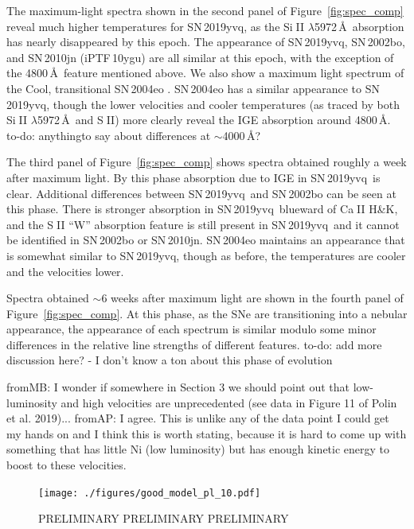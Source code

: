 \documentclass[twocolumn]{aastex63}
\def\ion#1#2{#1$\;${\footnotesize\rm{#2}}\relax}
\newcommand{\frommb}[1]{{\color{purple} fromMB: {#1}}}
\newcommand{\fromabi}[1]{{\color{teal} fromAP: {#1}}}
\newcommand{\todo}[1]{{\color{magenta} to-do: {#1}}}
\newcommand{\sn}{SN\,2019yvq}
\begin{document}
The maximum-light spectra shown in the second panel of
Figure~\ref{fig:spec_comp} reveal much higher temperatures for \sn, as the
\ion{Si}{II} $\lambda$5972\,\AA\ absorption has nearly disappeared by this
epoch. The appearance of \sn, SN\,2002bo, and SN\,2010jn (iPTF\,10ygu) are all
similar at this epoch, with the exception of the 4800\,\AA\ feature mentioned
above. We also show a maximum light spectrum of the \citet{Branch06} Cool,
transitional SN\,2004eo \citep{Pastorello07}. SN\,2004eo has a similar
appearance to \sn, though the lower velocities and cooler temperatures (as
traced by both \ion{Si}{II} $\lambda$5972\,\AA\ and \ion{S}{II}) more clearly
reveal the IGE absorption around 4800\,\AA. \todo{anythingto say about
differences at $\sim$4000\,\AA?}

The third panel of Figure~\ref{fig:spec_comp} shows spectra obtained roughly a
week after maximum light. By this phase absorption due to IGE in \sn\ is
clear. Additional differences between \sn\ and SN\,2002bo can be seen at this
phase. There is stronger absorption in \sn\ blueward of \ion{Ca}{II} H\&K, and
the \ion{S}{II} ``W'' absorption feature is still present in \sn\ and it
cannot be identified in SN\,2002bo or SN\,2010jn. SN\,2004eo maintains an
appearance that is somewhat similar to \sn, though as before, the temperatures
are cooler and the velocities lower.

Spectra obtained $\sim$6 weeks after maximum light are shown in the fourth
panel of Figure~\ref{fig:spec_comp}. At this phase, as the SNe are
transitioning into a nebular appearance, the appearance of each spectrum is
similar modulo some minor differences in the relative line strengths of
different features. \todo{add more discussion here? - I don't know a ton about
this phase of evolution}

\frommb{I wonder if somewhere in Section 3  we should point out that low-luminosity and high velocities are unprecedented (see data in Figure 11 of Polin et al. 2019)...} \fromabi{I agree. This is unlike any of the data point I could get my hands on and I think this is worth stating, because it is hard to come up with something that has little Ni (low luminosity) but has enough kinetic energy to boost to these velocities.}

\begin{figure}
    \centering
    \texttt{[image: ./figures/good\_model\_pl\_10.pdf]}
    \caption{PRELIMINARY PRELIMINARY PRELIMINARY}
    \label{fig:tardis}
\end{figure}
\end{document}
